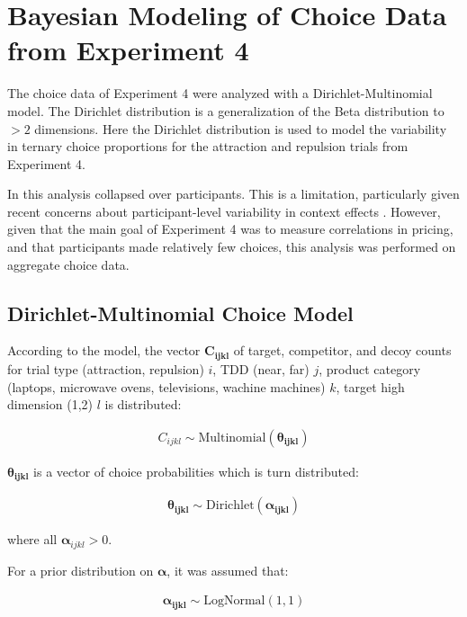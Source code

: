 \chapter{Bayesian Modeling of Choice Data from Experiment 4}

The choice data of Experiment 4 were analyzed with a Dirichlet-Multinomial model. The Dirichlet distribution is a generalization of the Beta distribution to $>2$ dimensions. Here the Dirichlet distribution is used to model the variability in ternary choice proportions for the attraction and repulsion trials from Experiment 4.

In this analysis collapsed over participants. This is a limitation, particularly given recent concerns about participant-level variability in context effects \parencite{liewAppropriacyAveragingStudy2016b,trueblood2015fragile}. However, given that the main goal of Experiment 4 was to measure correlations in pricing, and that participants made relatively few choices, this analysis was performed on aggregate choice data.

\section{Dirichlet-Multinomial Choice Model}

According to the model, the vector $\boldsymbol{C_{ijkl}}$ of target, competitor, and decoy counts for trial type (attraction, repulsion) $i$, TDD (near, far) $j$, product category (laptops, microwave ovens, televisions, wachine machines)  $k$, target high dimension (1,2) $l$ is distributed:

\begin{align}
    C_{ijkl} \sim \text{Multinomial}(\boldsymbol{\theta_{ijkl}})
\end{align}

$\boldsymbol{\theta_{ijkl}}$ is a vector of choice probabilities which is turn distributed:

\begin{align}
    \boldsymbol{\theta_{ijkl}} \sim \text{Dirichlet}(\boldsymbol{\alpha_{ijkl}})
\end{align}

where all $\boldsymbol{\alpha}_{ijkl}>0$. 

For a prior distribution on $\boldsymbol{\alpha}$, it was assumed that:

\begin{align}
    \boldsymbol{\alpha_{ijkl}} \sim \text{LogNormal}(1,1)
\end{align}

